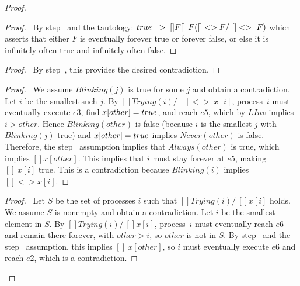 \documentclass[fleqn,leqno]{article}
\begin{document}
\begin{proof}
\vspace{10pt}

\begin{proof}
\pf\ By step~ and the tautology:
     $\TRUE \;~>\; []F \/ []~F \/ ([]<>F /\ []<>~F)$
which asserts that either $F$ is eventually forever true or
forever false, or else it is infinitely often true and
infinitely often false.
\end{proof}
\begin{proof}
\pf\ By step~, this provides the desired contradiction.
\end{proof}
\begin{proof}
\pf\ We assume $Blinking(j)$ is true for some $j$ and obtain
a contradiction.  Let $i$ be the smallest such $j$.
By 
   $[]Trying(i) /\ []<>~x[i]$, 
process~$i$ must eventually execute $e3$, find $x[other]=\TRUE$, and
reach $e5$, which  by $LInv$ implies $i>other$.  Hence $Blinking(other)$ is false
(because $i$ is the smallest $j$ with $Blinking(j)$ true)
and $x[other]=\TRUE$ implies $Never(other)$ is false.  Therefore, the
step~ assumption implies that $Always(other)$ is true, which
implies $[]x[other]$.
This implies that $i$ must stay forever at $e5$, making $[]~x[i]$ true.  
This is
a contradiction because $Blinking(i)$ implies $[]<>x[i]$.
\end{proof}

\begin{proof}
\pf\ Let $S$ be the set of processes $i$ such that 
  $[]Trying(i) /\ []x[i]$ holds.  We assume
$S$ is nonempty and obtain a contradiction.  Let $i$ be the smallest
element in $S$.  By 
  $[]Trying(i) /\ []x[i]$, 
process~$i$ must eventually reach $e6$ and remain there forever,
with $other > i$, so $other$ is not in $S$.
By step~ and the step~ assumption, this implies
$[]~x[other]$, so $i$ must eventually execute $e6$ and reach $e2$,
which is a contradiction.
\end{proof}


\end{proof}
\end{document}
